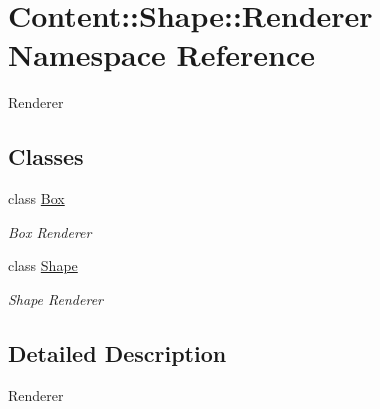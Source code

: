 \hypertarget{namespaceContent_1_1Shape_1_1Renderer}{
\section{Content::Shape::Renderer Namespace Reference}
\label{namespaceContent_1_1Shape_1_1Renderer}
}


Renderer  
\subsection*{Classes}
\begin{DoxyCompactItemize}
\item 
class \hyperlink{classContent_1_1Shape_1_1Renderer_1_1Box}{Box}
\begin{DoxyCompactList}\small\item\em Box Renderer \item\end{DoxyCompactList}\item 
class \hyperlink{classContent_1_1Shape_1_1Renderer_1_1Shape}{Shape}
\begin{DoxyCompactList}\small\item\em Shape Renderer \item\end{DoxyCompactList}\end{DoxyCompactItemize}


\subsection{Detailed Description}
Renderer 
